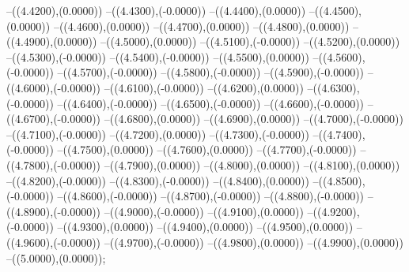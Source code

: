 {	--({\sx*(4.4200)},{\sy*(0.0000)})
	--({\sx*(4.4300)},{\sy*(-0.0000)})
	--({\sx*(4.4400)},{\sy*(0.0000)})
	--({\sx*(4.4500)},{\sy*(0.0000)})
	--({\sx*(4.4600)},{\sy*(0.0000)})
	--({\sx*(4.4700)},{\sy*(0.0000)})
	--({\sx*(4.4800)},{\sy*(0.0000)})
	--({\sx*(4.4900)},{\sy*(0.0000)})
	--({\sx*(4.5000)},{\sy*(0.0000)})
	--({\sx*(4.5100)},{\sy*(-0.0000)})
	--({\sx*(4.5200)},{\sy*(0.0000)})
	--({\sx*(4.5300)},{\sy*(-0.0000)})
	--({\sx*(4.5400)},{\sy*(-0.0000)})
	--({\sx*(4.5500)},{\sy*(0.0000)})
	--({\sx*(4.5600)},{\sy*(-0.0000)})
	--({\sx*(4.5700)},{\sy*(-0.0000)})
	--({\sx*(4.5800)},{\sy*(-0.0000)})
	--({\sx*(4.5900)},{\sy*(-0.0000)})
	--({\sx*(4.6000)},{\sy*(-0.0000)})
	--({\sx*(4.6100)},{\sy*(-0.0000)})
	--({\sx*(4.6200)},{\sy*(0.0000)})
	--({\sx*(4.6300)},{\sy*(-0.0000)})
	--({\sx*(4.6400)},{\sy*(-0.0000)})
	--({\sx*(4.6500)},{\sy*(-0.0000)})
	--({\sx*(4.6600)},{\sy*(-0.0000)})
	--({\sx*(4.6700)},{\sy*(-0.0000)})
	--({\sx*(4.6800)},{\sy*(0.0000)})
	--({\sx*(4.6900)},{\sy*(0.0000)})
	--({\sx*(4.7000)},{\sy*(-0.0000)})
	--({\sx*(4.7100)},{\sy*(-0.0000)})
	--({\sx*(4.7200)},{\sy*(0.0000)})
	--({\sx*(4.7300)},{\sy*(-0.0000)})
	--({\sx*(4.7400)},{\sy*(-0.0000)})
	--({\sx*(4.7500)},{\sy*(0.0000)})
	--({\sx*(4.7600)},{\sy*(0.0000)})
	--({\sx*(4.7700)},{\sy*(-0.0000)})
	--({\sx*(4.7800)},{\sy*(-0.0000)})
	--({\sx*(4.7900)},{\sy*(0.0000)})
	--({\sx*(4.8000)},{\sy*(0.0000)})
	--({\sx*(4.8100)},{\sy*(0.0000)})
	--({\sx*(4.8200)},{\sy*(-0.0000)})
	--({\sx*(4.8300)},{\sy*(-0.0000)})
	--({\sx*(4.8400)},{\sy*(0.0000)})
	--({\sx*(4.8500)},{\sy*(-0.0000)})
	--({\sx*(4.8600)},{\sy*(-0.0000)})
	--({\sx*(4.8700)},{\sy*(-0.0000)})
	--({\sx*(4.8800)},{\sy*(-0.0000)})
	--({\sx*(4.8900)},{\sy*(-0.0000)})
	--({\sx*(4.9000)},{\sy*(-0.0000)})
	--({\sx*(4.9100)},{\sy*(0.0000)})
	--({\sx*(4.9200)},{\sy*(-0.0000)})
	--({\sx*(4.9300)},{\sy*(0.0000)})
	--({\sx*(4.9400)},{\sy*(0.0000)})
	--({\sx*(4.9500)},{\sy*(0.0000)})
	--({\sx*(4.9600)},{\sy*(-0.0000)})
	--({\sx*(4.9700)},{\sy*(-0.0000)})
	--({\sx*(4.9800)},{\sy*(0.0000)})
	--({\sx*(4.9900)},{\sy*(0.0000)})
	--({\sx*(5.0000)},{\sy*(0.0000)});
}
